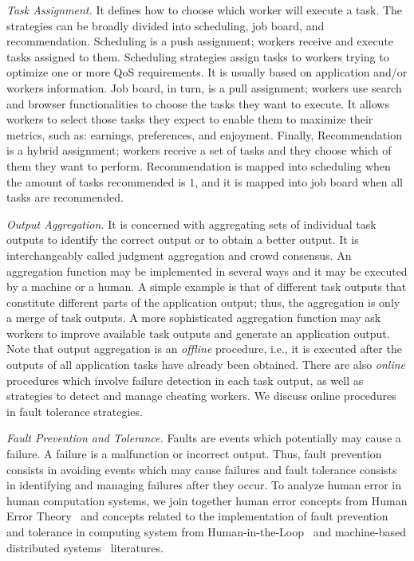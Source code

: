 \documentclass[11pt]{bmc_article_s50}
\begin{document}
\textit{Task Assignment.} It defines how to choose which worker will execute a task. The strategies can be broadly divided into scheduling, job board, and recommendation. Scheduling is a push assignment; workers receive and execute tasks assigned to them. Scheduling strategies assign tasks to workers trying to optimize one or more QoS requirements. It is usually based on application and/or workers information. Job board, in turn, is a pull assignment; workers use search and browser functionalities to choose the tasks they want to execute. It allows workers to select those tasks they expect to enable them to maximize their metrics, such as: earnings, preferences, and enjoyment. Finally, Recommendation is a hybrid assignment; workers receive a set of tasks and they choose which of them they want to perform. Recommendation is mapped into scheduling when the amount of tasks recommended is $1$, and it is mapped into job board when all tasks are recommended.

\textit{Output Aggregation.} It is concerned with aggregating sets of individual task outputs to identify the correct output or to obtain a better output. It is interchangeably called judgment aggregation and crowd consensus. An aggregation function may be implemented in several ways and it may be executed by a machine or a human. A simple example is that of different task outputs that constitute different parts of the application output; thus, the aggregation is only a merge of task outputs. A more sophisticated aggregation function may ask workers to improve available task outputs and generate an application output. Note that output aggregation is an \textit{offline} procedure, i.e., it is executed after the outputs of all application tasks have already been obtained. There are also \textit{online} procedures which involve failure detection in each task output, as well as strategies to detect and manage cheating workers. We discuss online procedures in fault tolerance strategies.

\textit{Fault Prevention and Tolerance.} Faults are events which potentially may cause a failure. A failure is a malfunction or incorrect output. Thus, fault prevention consists in avoiding events which may cause failures and fault tolerance consists in identifying and managing failures after they occur. To analyze human error in human computation systems, we join together human error concepts from Human Error Theory~\cite{James:HumanError:1990} and concepts related to the implementation of fault prevention and tolerance in computing system from Human-in-the-Loop~\cite{Cranor:UPSEC:2008} and machine-based distributed systems~\cite{Jalote:FTD:1994} literatures.
\end{document}
